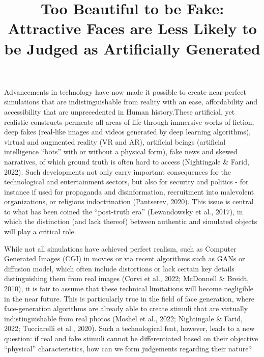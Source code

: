 \documentclass[
  man,
  floatsintext,
  longtable,
  nolmodern,
  notxfonts,
  notimes,
  colorlinks=true,linkcolor=blue,citecolor=blue,urlcolor=blue]{apa7}
\title{Too Beautiful to be Fake: Attractive Faces are Less Likely to be
Judged as Artificially Generated}
\begin{document}
\maketitle


\setcounter{secnumdepth}{-\maxdimen} %

\setlength\LTleft{0pt}

\resetlinenumber[1]



Advancements in technology have now made it possible to create
near-perfect simulations that are indistinguishable from reality with an
ease, affordability and accessibility that are unprecedented in Human
history.These artificial, yet realistic constructs permeate all areas of
life through immersive works of fiction, deep fakes (real-like images
and videos generated by deep learning algorithms), virtual and augmented
reality (VR and AR), artificial beings (artificial intelligence ``bots''
with or without a physical form), fake news and skewed narratives, of
which ground truth is often hard to access (Nightingale \& Farid, 2022).
Such developments not only carry important consequences for the
technological and entertainment sectors, but also for security and
politics - for instance if used for propaganda and disinformation,
recruitment into malevolent organizations, or religious indoctrination
(Pantserev, 2020). This issue is central to what has been coined the
``post-truth era'' (Lewandowsky et al., 2017), in which the distinction
(and lack thereof) between authentic and simulated objects will play a
critical role.

While not all simulations have achieved perfect realism, such as
Computer Generated Images (CGI) in movies or via recent algorithms such
as GANs or diffusion model, which often include distortions or lack
certain key details distinguishing them from real images (Corvi et al.,
2022; McDonnell \& Breidt, 2010), it is fair to assume that these
technical limitations will become negligible in the near future. This is
particularly true in the field of face generation, where face-generation
algorithms are already able to create stimuli that are virtually
indistinguishable from real photos (Moshel et al., 2022; Nightingale \&
Farid, 2022; Tucciarelli et al., 2020). Such a technological feat,
however, leads to a new question: if real and fake stimuli cannot be
differentiated based on their objective ``physical'' characteristics,
how can we form judgements regarding their nature?
\end{document}
